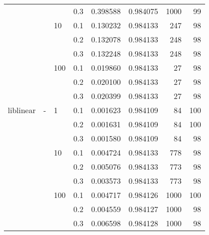 \begin{table}[H]
\begin{tabular}{llllrrrr}
          &   &     & 0.3 &  0.398588 &  0.984075 &    1000 &    99 \\
          &   & 10  & 0.1 &  0.130232 &  0.984133 &     247 &    98 \\
          &   &     & 0.2 &  0.132078 &  0.984133 &     248 &    98 \\
          &   &     & 0.3 &  0.132248 &  0.984133 &     248 &    98 \\
          &   & 100 & 0.1 &  0.019860 &  0.984133 &      27 &    98 \\
          &   &     & 0.2 &  0.020100 &  0.984133 &      27 &    98 \\
          &   &     & 0.3 &  0.020399 &  0.984133 &      27 &    98 \\
liblinear & - & 1   & 0.1 &  0.001623 &  0.984109 &      84 &   100 \\
          &   &     & 0.2 &  0.001631 &  0.984109 &      84 &   100 \\
          &   &     & 0.3 &  0.001580 &  0.984109 &      84 &    98 \\
          &   & 10  & 0.1 &  0.004724 &  0.984133 &     778 &    98 \\
          &   &     & 0.2 &  0.005076 &  0.984133 &     773 &    98 \\
          &   &     & 0.3 &  0.003573 &  0.984133 &     773 &    98 \\
          &   & 100 & 0.1 &  0.004717 &  0.984126 &    1000 &   100 \\
          &   &     & 0.2 &  0.004559 &  0.984127 &    1000 &    98 \\
          &   &     & 0.3 &  0.006598 &  0.984128 &    1000 &    98 \\
\bottomrule
\end{tabular}
\end{table}
